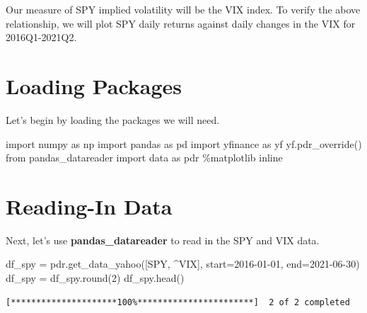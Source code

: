 \documentclass[
  letterpaper,
  DIV=11,
  numbers=noendperiod]{scrreprt}
\newenvironment{Shaded}{\begin{snugshade}}{\end{snugshade}}
\newcommand{\BuiltInTok}[1]{\textcolor[rgb]{0.00,0.23,0.31}{#1}}
\newcommand{\DecValTok}[1]{\textcolor[rgb]{0.68,0.00,0.00}{#1}}
\newcommand{\ImportTok}[1]{\textcolor[rgb]{0.00,0.46,0.62}{#1}}
\newcommand{\NormalTok}[1]{\textcolor[rgb]{0.00,0.23,0.31}{#1}}
\newcommand{\OperatorTok}[1]{\textcolor[rgb]{0.37,0.37,0.37}{#1}}
\newcommand{\StringTok}[1]{\textcolor[rgb]{0.13,0.47,0.30}{#1}}
\begin{document}
Our measure of SPY implied volatility will be the VIX index. To verify
the above relationship, we will plot SPY daily returns against daily
changes in the VIX for 2016Q1-2021Q2.

\hypertarget{loading-packages-4}{%
\section{Loading Packages}\label{loading-packages-4}}

Let's begin by loading the packages we will need.

\begin{Shaded}
\begin{Highlighting}[]
\ImportTok{import}\NormalTok{ numpy }\ImportTok{as}\NormalTok{ np}
\ImportTok{import}\NormalTok{ pandas }\ImportTok{as}\NormalTok{ pd}
\ImportTok{import}\NormalTok{ yfinance }\ImportTok{as}\NormalTok{ yf}
\NormalTok{yf.pdr\_override()}
\ImportTok{from}\NormalTok{ pandas\_datareader }\ImportTok{import}\NormalTok{ data }\ImportTok{as}\NormalTok{ pdr}
\OperatorTok{\%}\NormalTok{matplotlib inline}
\end{Highlighting}
\end{Shaded}

\hypertarget{reading-in-data-9}{%
\section{Reading-In Data}\label{reading-in-data-9}}

Next, let's use \textbf{pandas\_datareader} to read in the SPY and VIX
data.

\begin{Shaded}
\begin{Highlighting}[]
\NormalTok{df\_spy }\OperatorTok{=}\NormalTok{ pdr.get\_data\_yahoo([}\StringTok{\textquotesingle{}SPY\textquotesingle{}}\NormalTok{, }\StringTok{\textquotesingle{}\^{}VIX\textquotesingle{}}\NormalTok{], start}\OperatorTok{=}\StringTok{\textquotesingle{}2016{-}01{-}01\textquotesingle{}}\NormalTok{, end}\OperatorTok{=}\StringTok{\textquotesingle{}2021{-}06{-}30\textquotesingle{}}\NormalTok{)}
\NormalTok{df\_spy }\OperatorTok{=}\NormalTok{ df\_spy.}\BuiltInTok{round}\NormalTok{(}\DecValTok{2}\NormalTok{)}
\NormalTok{df\_spy.head()}
\end{Highlighting}
\end{Shaded}

\begin{verbatim}
[*********************100%***********************]  2 of 2 completed
\end{verbatim}
\end{document}

